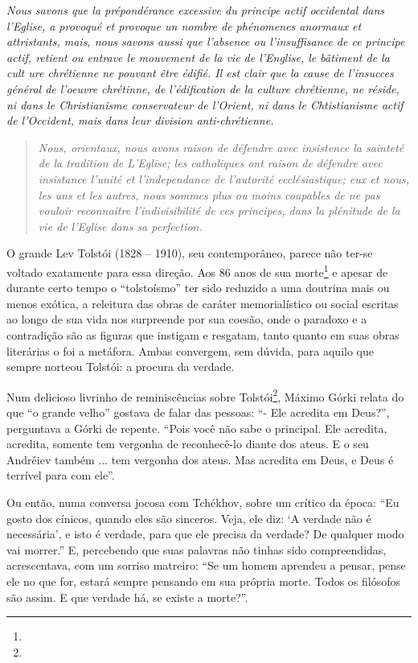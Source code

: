 \emph{Nous savons que la prépondérance excessive du principe actif
occidental dans l'Eglise, a provoqué et provoque un nombre de phénomenes
anormaux et attristants, mais, nous savons aussi que l'absence ou
l'insuffisance de ce principe actif, retient ou entrave le mouvement de
la vie de l'Englise, le bâtiment de la cult ure chrétienne ne pouvant
être édifié. Il est clair que la cause de l'insucces général de l'oeuvre
chrétinne, de l'édification de la culture chrétienne, ne réside, ni dans
le Christianisme conservateur de l'Orient, ni dans le Chtistianisme
actif de l'Occident, mais dans leur division anti-chrétienne.}

\begin{quote}
\emph{Nous, orientaux, nous avons raison de défendre avec insistence la
sainteté de la tradition de L'Eglise; les catholiques ont raison de
défendre avec insistance l'unité et l'independance de l'autorité
ecclésiastique; eux et nous, les uns et les autres, nous sommes plus ou
moins coupables de ne pas vouloir reconnaitre l'indivisibilité de ces
principes, dans la plénitude de la vie de l'Eglise dans sa perfection.}
\end{quote}

O grande Lev Tolstói (1828 -- 1910), seu contemporâneo, parece não
ter-se voltado exatamente para essa direção. Aos 86 anos de sua
morte\footnote{} e apesar de durante certo tempo o ``tolstoísmo'' ter
sido reduzido a uma doutrina mais ou menos exótica, a releitura das
obras de caráter memorialístico ou social escritas ao longo de sua vida
nos surpreende por sua coesão, onde o paradoxo e a contradição são as
figuras que instigam e resgatam, tanto quanto em suas obras literárias o
foi a metáfora. Ambas convergem, sem dúvida, para aquilo que sempre
norteou Tolstói: a procura da verdade.

Num delicioso livrinho de reminiscências sobre Tolstói\footnote{},
Máximo Górki relata do que ``o grande velho'' gostava de falar das
pessoas: ``- Ele acredita em Deus?'', perguntava a Górki de repente.
``Pois você não sabe o principal. Ele acredita, acredita, somente tem
vergonha de reconhecê-lo diante dos ateus. E o seu Andréiev também ...
tem vergonha dos ateus. Mas acredita em Deus, e Deus é terrível para com
ele''.

Ou então, numa conversa jocosa com Tchékhov, sobre um crítico da época:
``Eu gosto dos cínicos, quando eles são sinceros. Veja, ele diz: `A
verdade não é necessária', e isto é verdade, para que ele precisa da
verdade? De qualquer modo vai morrer.'' E, percebendo que suas palavras
não tinhas sido compreendidas, acrescentava, com um sorriso matreiro:
``Se um homem aprendeu a pensar, pense ele no que for, estará sempre
pensando em sua própria morte. Todos os filósofos são assim. E que
verdade há, se existe a morte?''.

